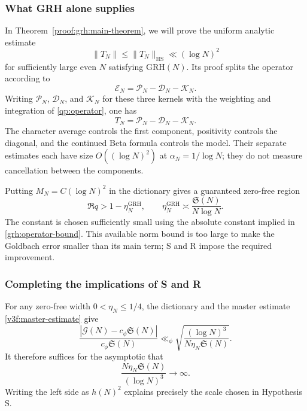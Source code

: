 \documentclass[12pt,a4paper]{amsart}
\numberwithin{equation}{section}
\def\le{\leqslant}
\theoremstyle{plain}
\theoremstyle{definition}
\theoremstyle{remark}
\begin{document}
\subsubsection{What GRH alone supplies}
\label{story:riemann-grh}

In Theorem~\ref{proof:grh:main-theorem}, we will prove the uniform
analytic estimate
\begin{equation}\label{grh:operator-bound}
 \|T_N\|\le\|T_N\|_{\mathrm{HS}}\ll(\log N)^2
\end{equation}
for sufficiently large even $N$ satisfying $\mathrm{GRH}(N)$.
Its proof splits the operator according to
\[
 \mathscr E_N=\mathscr P_N-\mathscr D_N-\mathscr K_N.
\]
Writing $\mathcal P_N$, $\mathcal D_N$, and $\mathcal K_N$
for these three kernels with the weighting and integration of
\eqref{qp:operator}, one has
\[
 T_N=\mathcal P_N-\mathcal D_N-\mathcal K_N.
\]
The character average controls the first component, positivity
controls the diagonal, and the continued Beta formula controls
the model. Their separate estimates each have size
$O((\log N)^2)$ at $\alpha_N=1/\log N$; they do not measure
cancellation between the components.

Putting $M_N=C(\log N)^2$ in the dictionary gives a guaranteed
zero-free region
\begin{equation}\label{grh:zero-free-width}
 \Re q>1-\eta_N^{\mathrm{GRH}},\qquad
 \eta_N^{\mathrm{GRH}}\asymp\frac{\mathfrak S(N)}{N\log N}.
\end{equation}
The constant is chosen sufficiently small using the absolute
constant implied in \eqref{grh:operator-bound}. This available norm
bound is too large to make the Goldbach error smaller than its
main term; S and R impose the required improvement.

\subsubsection{Completing the implications of S and R}
\label{story:riemann-hypotheses}

For any zero-free width $0<\eta_N\le1/4$, the dictionary and
the master estimate \eqref{v3f:master-estimate} give
\begin{equation}\label{v3f:relative-width}
 \frac{|\mathcal G(N)-c_\phi\mathfrak S(N)|}{c_\phi\mathfrak S(N)}
 \ll_\phi\sqrt{\frac{(\log N)^3}{N\eta_N\mathfrak S(N)}}.
\end{equation}
It therefore suffices for the asymptotic that
\begin{equation}\label{v3f:minimal-width}
 \frac{N\eta_N\mathfrak S(N)}{(\log N)^3}\longrightarrow\infty.
\end{equation}
Writing the left side as $h(N)^2$ explains precisely the scale
chosen in Hypothesis S.
\end{document}
